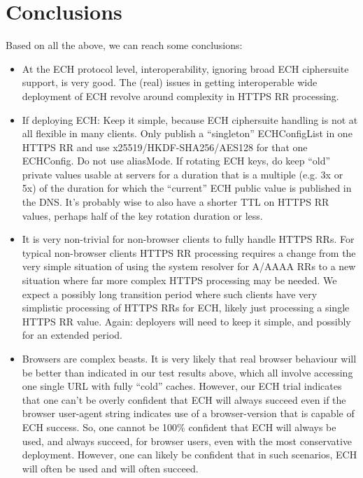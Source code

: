 \section{Conclusions}

Based on all the above, we can reach some conclusions:

\begin{itemize}

    \item
        At the ECH protocol level, interoperability, ignoring broad ECH
        ciphersuite support, is very good. The (real) issues in getting
        interoperable wide deployment of ECH revolve around complexity in HTTPS
        RR processing.

    \item
        If deploying ECH: Keep it simple, because ECH ciphersuite handling is
        not at all flexible in many clients. Only publish a ``singleton''
        ECHConfigList in one HTTPS RR and use x25519/HKDF-SHA256/AES128 for
        that one ECHConfig. Do not use aliasMode. If rotating ECH keys, do keep
        ``old'' private values usable at servers for a duration that is a
        multiple (e.g. 3x or 5x) of the duration for which the ``current'' ECH
        public value is published in the DNS. It's probably wise to also have a
        shorter TTL on HTTPS RR values, perhaps half of the key rotation
        duration or less.

    \item It is very non-trivial for non-browser clients to fully handle HTTPS
        RRs.  For typical non-browser clients HTTPS RR processing requires a
        change from the very simple situation of using the system resolver for
        A/AAAA RRs to a new situation where far more complex HTTPS processing
        may be needed. We expect a possibly long transition period where such
        clients have very simplistic processing of HTTPS RRs for ECH, likely
        just processing a single HTTPS RR value. Again: deployers will need to
        keep it simple, and possibly for an extended period.

    \item
        Browsers are complex beasts. It is very likely that real browser
        behaviour will be better than indicated in our test results above,
        which all involve accessing one single URL with fully ``cold'' caches.
        However, our ECH trial \cite{echtrial} indicates that one can't be
        overly confident that ECH will always succeed even if the browser
        user-agent string indicates use of a browser-version that is capable of
        ECH success.  So, one cannot be 100\% confident that ECH will always be
        used, and always succeed, for browser users, even with the most
        conservative deployment. However, one can likely be confident that in
        such scenarios, ECH will often be used and will often succeed.

\end{itemize}

